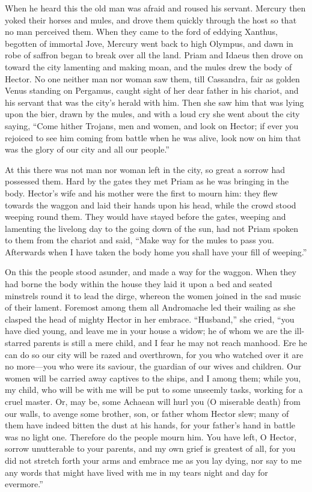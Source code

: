 When he heard this the old man was afraid and roused his servant. Mercury
then yoked their horses and mules, and drove them quickly through the host
so that no man perceived them. When they came to the ford of eddying
Xanthus, begotten of immortal Jove, Mercury went back to high Olympus, and
dawn in robe of saffron began to break over all the land. Priam and Idaeus
then drove on toward the city lamenting and making moan, and the mules
drew the body of Hector. No one neither man nor woman saw them, till
Cassandra, fair as golden Venus standing on Pergamus, caught sight of her
dear father in his chariot, and his servant that was the city’s herald
with him. Then she saw him that was lying upon the bier, drawn by the
mules, and with a loud cry she went about the city saying, “Come hither
Trojans, men and women, and look on Hector; if ever you rejoiced to see
him coming from battle when he was alive, look now on him that was the
glory of our city and all our people.”

At this there was not man nor woman left in the city, so great a sorrow
had possessed them. Hard by the gates they met Priam as he was bringing in
the body. Hector’s wife and his mother were the first to mourn him: they
flew towards the waggon and laid their hands upon his head, while the
crowd stood weeping round them. They would have stayed before the gates,
weeping and lamenting the livelong day to the going down of the sun, had
not Priam spoken to them from the chariot and said, “Make way for the
mules to pass you. Afterwards when I have taken the body home you shall
have your fill of weeping.”

On this the people stood asunder, and made a way for the waggon. When they
had borne the body within the house they laid it upon a bed and seated
minstrels round it to lead the dirge, whereon the women joined in the sad
music of their lament. Foremost among them all Andromache led their
wailing as she clasped the head of mighty Hector in her embrace.
“Husband,” she cried, “you have died young, and leave me in your house a
widow; he of whom we are the ill-starred parents is still a mere child,
and I fear he may not reach manhood. Ere he can do so our city will be
razed and overthrown, for you who watched over it are no more—you
who were its saviour, the guardian of our wives and children. Our women
will be carried away captives to the ships, and I among them; while you,
my child, who will be with me will be put to some unseemly tasks, working
for a cruel master. Or, may be, some Achaean will hurl you (O miserable
death) from our walls, to avenge some brother, son, or father whom Hector
slew; many of them have indeed bitten the dust at his hands, for your
father’s hand in battle was no light one. Therefore do the people mourn
him. You have left, O Hector, sorrow unutterable to your parents, and my
own grief is greatest of all, for you did not stretch forth your arms and
embrace me as you lay dying, nor say to me any words that might have lived
with me in my tears night and day for evermore.”

